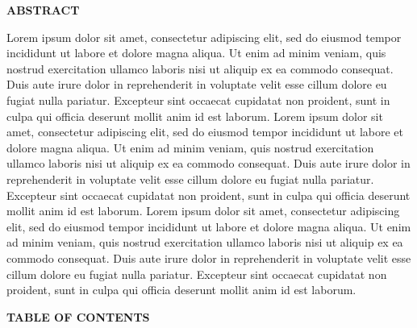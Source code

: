 \documentclass[12pt]{article}
\newcommand{\centersection}[1]{%
  \begin{center}
    \fontfamily{ptm}\fontsize{14}{16}\selectfont\bfseries\uppercase{#1}
  \end{center}
}
\begin{document}

\centersection{ABSTRACT}

\fontsize{12}{14}\selectfont
Lorem ipsum dolor sit amet, consectetur adipiscing elit, sed do eiusmod tempor incididunt ut labore et dolore magna aliqua. Ut enim ad minim veniam, quis nostrud exercitation ullamco laboris nisi ut aliquip ex ea commodo consequat. Duis aute irure dolor in reprehenderit in voluptate velit esse cillum dolore eu fugiat nulla pariatur. Excepteur sint occaecat cupidatat non proident, sunt in culpa qui officia deserunt mollit anim id est laborum.
Lorem ipsum dolor sit amet, consectetur adipiscing elit, sed do eiusmod tempor incididunt ut labore et dolore magna aliqua. Ut enim ad minim veniam, quis nostrud exercitation ullamco laboris nisi ut aliquip ex ea commodo consequat. Duis aute irure dolor in reprehenderit in voluptate velit esse cillum dolore eu fugiat nulla pariatur. Excepteur sint occaecat cupidatat non proident, sunt in culpa qui officia deserunt mollit anim id est laborum.
Lorem ipsum dolor sit amet, consectetur adipiscing elit, sed do eiusmod tempor incididunt ut labore et dolore magna aliqua. Ut enim ad minim veniam, quis nostrud exercitation ullamco laboris nisi ut aliquip ex ea commodo consequat. Duis aute irure dolor in reprehenderit in voluptate velit esse cillum dolore eu fugiat nulla pariatur. Excepteur sint occaecat cupidatat non proident, sunt in culpa qui officia deserunt mollit anim id est laborum.

\newpage
\centersection{TABLE OF CONTENTS}
\end{document}
